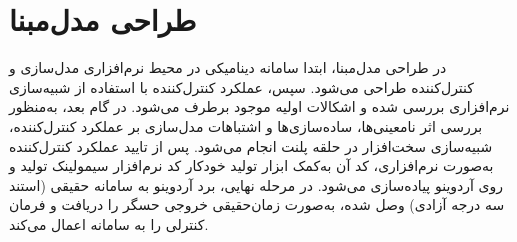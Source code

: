 \section{طراحی مدل‌مبنا}
در طراحی مدل‌مبنا، ابتدا سامانه دینامیكی در محیط نرم‌افزاری مدل‌سازی و کنترل‌کننده طراحی می‌شود. سپس،  عملكرد کنترل‌کننده با استفاده از شبیه‌سازی نرم‌افزاری بررسی شده و اشكالات اولیه موجود برطرف می‌شود. در گام بعد، به‌منظور بررسی اثر نامعینی‌ها، ساده‌سازی‌ها و اشتباهات مدل‌سازی بر عملكرد کنترل‌کننده، شبیه‌سازی سخت‌افزار در حلقه پلنت
انجام می‌شود. پس از تایید عملكرد کنترل‌کننده به‌صورت نرم‌افزاری، کد آن به‌کمک ابزار تولید خودکار کد نرم‌افزار سیمولینک تولید و روی آردوینو پیاده‌سازی می‌شود.
 در مرحله نهایی، برد آردوینو به سامانه حقیقی (استند سه درجه آزادی) وصل شده، به‌صورت
زمان‌حقیقی خروجی حسگر را دریافت و فرمان کنترلی را به سامانه اعمال می‌کند.
